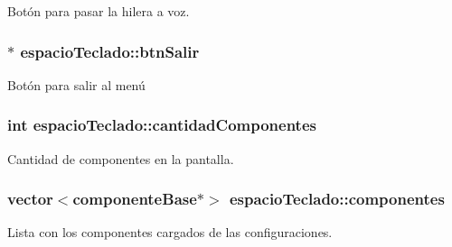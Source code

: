 Botón para pasar la hilera a voz. 

\hypertarget{classespacio_teclado_a82d9f915e17ee3491992da61a0d28a8f}{}
\subsubsection[{btn\+Salir}]{$\ast$ espacio\+Teclado\+::btn\+Salir\hspace{0.3cm}{\ttfamily [private]}}\label{classespacio_teclado_a82d9f915e17ee3491992da61a0d28a8f}


Botón para salir al menú 

\hypertarget{classespacio_teclado_ac6f638174ab5143b45b5a0658f6782e9}{}
\subsubsection[{cantidad\+Componentes}]{\setlength{\rightskip}{0pt plus 5cm}int espacio\+Teclado\+::cantidad\+Componentes\hspace{0.3cm}{\ttfamily [private]}}\label{classespacio_teclado_ac6f638174ab5143b45b5a0658f6782e9}


Cantidad de componentes en la pantalla. 

\hypertarget{classespacio_teclado_aad1549ce795db466bad7c47a5f82582c}{}
\subsubsection[{componentes}]{\setlength{\rightskip}{0pt plus 5cm}vector$<${\bf componente\+Base}$\ast$$>$ espacio\+Teclado\+::componentes\hspace{0.3cm}{\ttfamily [private]}}\label{classespacio_teclado_aad1549ce795db466bad7c47a5f82582c}


Lista con los componentes cargados de las configuraciones. 

\hypertarget{classespacio_teclado_af215829331b2ed6d0a4485eab2a37311}{}
